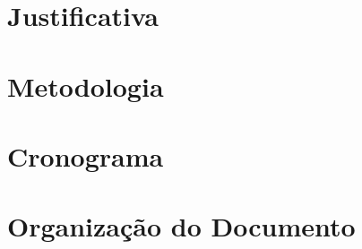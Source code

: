 \section{Justificativa}


\section{Metodologia}


\section{Cronograma}


\section{Organização do Documento}

